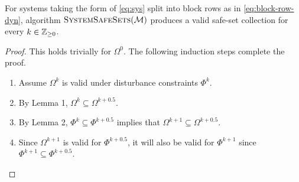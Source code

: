 \begin{lemma}
For systems taking the form of \ref{eq:sys} split into block rows as in \autoref{eq:block-row-dyn}, algorithm $\Call{SystemSafeSets}{\agents}$ produces a valid safe-set collection for every $k\in\mathbb{Z}_{\geq 0}$. 
\end{lemma}
\begin{proof}
This holds trivially for $\Omega^0$. The following induction steps complete the proof.
\begin{enumerate}
	\item Assume $\Omega^k$ is valid under disturbance constraints $\Phi^k$.
	\item By Lemma 1, $\Omega^k\subseteq\Omega^{k+0.5}$.
	\item By Lemma 2, $\Phi^k\subseteq\Phi^{k+0.5}$ implies that $\Omega^{k+1}\subseteq\Omega^{k+0.5}$.
	\item Since $\Omega^{k+1}$ is valid for $\Phi^{k+0.5}$, it will also be valid for $\Phi^{k+1}$ since $\Phi^{k+1}\subseteq\Phi^{k+0.5}$.
\end{enumerate}
\end{proof}